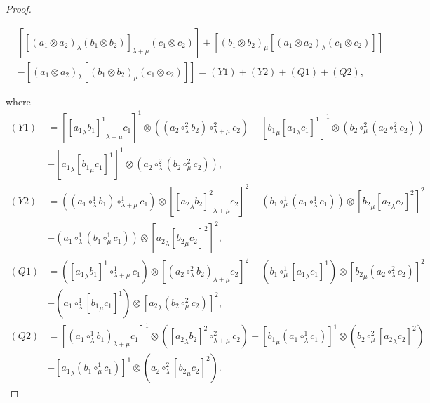 \documentclass[11pt,letterpaper,reqno]{amsart}
\theoremstyle{definition}
\numberwithin{equation}{section}
\begin{document}
\begin{proof}
\begin{itemize}
\begin{align*}
&[[(a_1\otimes a_2)_\lambda (b_1\otimes b_2)]_{\lambda+\mu} (c_1\otimes c_2)]+[(b_1\otimes b_2)_\mu [(a_1\otimes a_2)_\lambda (c_1\otimes c_2)]]\\
&-[(a_1\otimes a_2)_\lambda [(b_1\otimes b_2)_\mu (c_1\otimes c_2)]]
=(Y1)+(Y2)+(Q1)+(Q2),
\end{align*}
\end{itemize}
where
\begin{align*}
(Y1)&=[{[{a_1}_{\lambda}b_1]^{1}}_{\lambda+\mu}c_1]^{1}\otimes ((a_2\circ^{2}_\lambda b_2)\circ^{2}_{\lambda+\mu} c_2)+[{b_1}_{\mu}[{a_1}_{\lambda}c_1]^{1}]^{1}\otimes (b_2\circ^{2}_\mu (a_2\circ^{2}_\lambda c_2))\\
&-[{a_1}_{\lambda}[{b_1}_{\mu}c_1]^{1}]^{1}\otimes (a_2\circ^{2}_\lambda (b_2\circ^{2}_\mu c_2)),\\
(Y2)&=((a_1\circ^{1}_\lambda b_1)\circ^{1}_{\lambda+\mu} c_1)\otimes [{[{a_2}_{\lambda}b_2]^{2}}_{\lambda+\mu}c_2]^{2}+(b_1\circ^{1}_\mu (a_1\circ^{1}_\lambda c_1))\otimes [{b_2}_{\mu}[{a_2}_{\lambda}c_2]^{2}]^{2}\\
&-(a_1\circ^{1}_\lambda (b_1\circ^{1}_\mu c_1))\otimes [{a_2}_{\lambda}[{b_2}_{\mu}c_2]^{2}]^{2},\\
(Q1)&=([{a_1}_{\lambda}b_1]^{1}\circ^{1}_{\lambda+\mu} c_1)\otimes [{(a_2\circ^{2}_\lambda b_2)}_{\lambda+\mu}c_2]^{2}+(b_1\circ^{1}_\mu [{a_1}_{\lambda}c_1]^{1})\otimes [{b_2}_{\mu}(a_2\circ^{2}_\lambda c_2)]^{2}\\
&-(a_1\circ^{1}_\lambda [{b_1}_{\mu}c_1]^{1})\otimes [{a_2}_{\lambda}(b_2\circ^{2}_\mu c_2)]^{2},\\
(Q2)&=[{(a_1\circ^{1}_\lambda b_1)}_{\lambda+\mu}c_1]^{1}\otimes ([{a_2}_{\lambda}b_2]^{2}\circ^{2}_{\lambda+\mu} c_2)+[{b_1}_{\mu}(a_1\circ^{1}_\lambda c_1)]^{1}\otimes (b_2\circ^{2}_\mu [{a_2}_{\lambda}c_2]^{2})\\
&-[{a_1}_{\lambda}(b_1\circ^{1}_\mu c_1)]^{1}\otimes (a_2\circ^{2}_\lambda [{b_2}_{\mu}c_2]^{2}).
\end{align*}


\end{proof}
\end{document}
